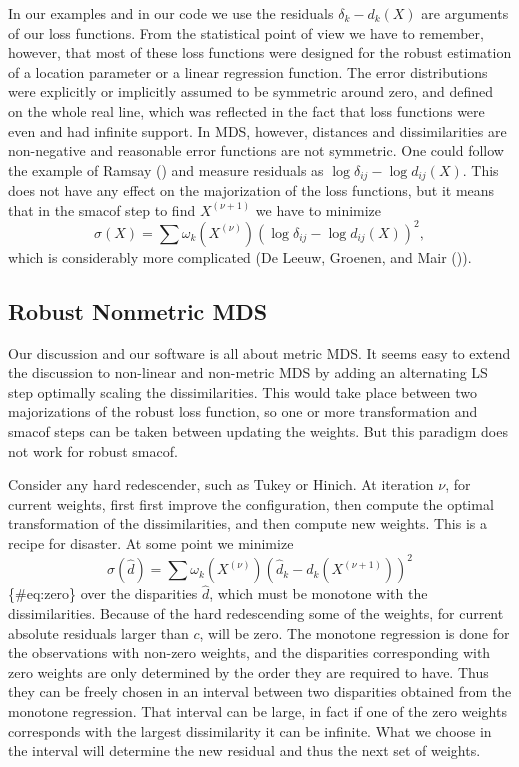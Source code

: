 \documentclass[
  12pt,
  letterpaper,
  DIV=11,
  numbers=noendperiod]{scrartcl}
\theoremstyle{definition}
\theoremstyle{definition}
\theoremstyle{plain}
\theoremstyle{plain}
\theoremstyle{plain}
\theoremstyle{remark}
\begin{document}
In our examples and in our code we use the residuals \(\delta_k-d_k(X)\)
are arguments of our loss functions. From the statistical point of view
we have to remember, however, that most of these loss functions were
designed for the robust estimation of a location parameter or a linear
regression function. The error distributions were explicitly or
implicitly assumed to be symmetric around zero, and defined on the whole
real line, which was reflected in the fact that loss functions were even
and had infinite support. In MDS, however, distances and dissimilarities
are non-negative and reasonable error functions are not symmetric. One
could follow the example of Ramsay () and
measure residuals as \(\log\delta_{ij}-\log d_{ij}(X)\). This does not
have any effect on the majorization of the loss functions, but it means
that in the smacof step to find \(X^{(\nu+1)}\) we have to minimize \[
\sigma(X)=\sum \omega_k(X^{(\nu)})(\log\delta_{ij}-\log d_{ij}(X))^2,
\] which is considerably more complicated (De Leeuw, Groenen, and Mair
()).

\subsection{Robust Nonmetric MDS}\label{robust-nonmetric-mds}

Our discussion and our software is all about metric MDS. It seems easy
to extend the discussion to non-linear and non-metric MDS by adding an
alternating LS step optimally scaling the dissimilarities. This would
take place between two majorizations of the robust loss function, so one
or more transformation and smacof steps can be taken between updating
the weights. But this paradigm does not work for robust smacof.

Consider any hard redescender, such as Tukey or Hinich. At iteration
\(\nu\), for current weights, first first improve the configuration,
then compute the optimal transformation of the dissimilarities, and then
compute new weights. This is a recipe for disaster. At some point we
minimize \[
\sigma(\hat d)=\sum \omega_k(X^{(\nu)})(\hat d_k-d_k(X^{(\nu+1)}))^2
\]\{\#eq:zero\} over the disparities \(\hat d\), which must be monotone
with the dissimilarities. Because of the hard redescending some of the
weights, for current absolute residuals larger than \(c\), will be zero.
The monotone regression is done for the observations with non-zero
weights, and the disparities corresponding with zero weights are only
determined by the order they are required to have. Thus they can be
freely chosen in an interval between two disparities obtained from the
monotone regression. That interval can be large, in fact if one of the
zero weights corresponds with the largest dissimilarity it can be
infinite. What we choose in the interval will determine the new residual
and thus the next set of weights.
\end{document}
